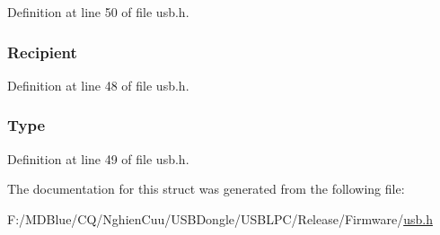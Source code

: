 Definition at line 50 of file usb.h.

\hypertarget{struct___r_e_q_u_e_s_t___t_y_p_e_1_1___b_m_aef3ec6aa3cef843da4d3125bddf87bcd}{
\subsubsection[{Recipient}]{ {\bf Recipient}}}
\label{struct___r_e_q_u_e_s_t___t_y_p_e_1_1___b_m_aef3ec6aa3cef843da4d3125bddf87bcd}


Definition at line 48 of file usb.h.

\hypertarget{struct___r_e_q_u_e_s_t___t_y_p_e_1_1___b_m_a18377a6c26b74546712af8fc06de7205}{
\subsubsection[{Type}]{ {\bf Type}}}
\label{struct___r_e_q_u_e_s_t___t_y_p_e_1_1___b_m_a18377a6c26b74546712af8fc06de7205}


Definition at line 49 of file usb.h.



The documentation for this struct was generated from the following file:\begin{DoxyCompactItemize}
\item 
F:/MDBlue/CQ/NghienCuu/USBDongle/USBLPC/Release/Firmware/\hyperlink{usb_8h}{usb.h}\end{DoxyCompactItemize}

